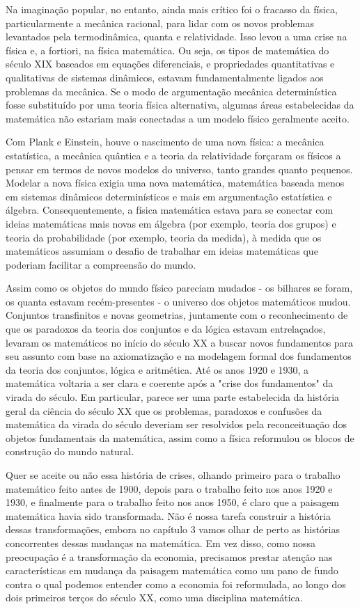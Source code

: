 \documentclass[12pt]{article}
\begin{document}
Na imaginação popular, no entanto, ainda mais crítico foi o fracasso da física, particularmente a mecânica racional, para lidar com os novos problemas levantados pela termodinâmica, quanta e relatividade. Isso levou a uma crise na física e, a fortiori, na física matemática. Ou seja, os tipos de matemática do século XIX baseados em equações diferenciais, e propriedades quantitativas e qualitativas de sistemas dinâmicos, estavam fundamentalmente ligados aos problemas da mecânica. Se o modo de argumentação mecânica determinística fosse substituído por uma teoria física alternativa, algumas áreas estabelecidas da matemática não estariam mais conectadas a um modelo físico geralmente aceito.

Com Plank e Einstein, houve o nascimento de uma nova física: a mecânica estatística, a mecânica quântica e a teoria da relatividade forçaram os físicos a pensar em termos de novos modelos do universo, tanto grandes quanto pequenos. Modelar a nova física exigia uma nova matemática, matemática baseada menos em sistemas dinâmicos determinísticos e mais em argumentação estatística e álgebra. Consequentemente, a física matemática estava para se conectar com ideias matemáticas mais novas em álgebra (por exemplo, teoria dos grupos) e teoria da probabilidade (por exemplo, teoria da medida), à medida que os matemáticos assumiam o desafio de trabalhar em ideias matemáticas que poderiam facilitar a compreensão do mundo.

Assim como os objetos do mundo físico pareciam mudados - os bilhares se foram, os quanta estavam recém-presentes - o universo dos objetos matemáticos mudou. Conjuntos transfinitos e novas geometrias, juntamente com o reconhecimento de que os paradoxos da teoria dos conjuntos e da lógica estavam entrelaçados, levaram os matemáticos no início do século XX a buscar novos fundamentos para seu assunto com base na axiomatização e na modelagem formal dos fundamentos da teoria dos conjuntos, lógica e aritmética. Até os anos 1920 e 1930, a matemática voltaria a ser clara e coerente após a "crise dos fundamentos" da virada do século. Em particular, parece ser uma parte estabelecida da história geral da ciência do século XX que os problemas, paradoxos e confusões da matemática da virada do século deveriam ser resolvidos pela reconceituação dos objetos fundamentais da matemática, assim como a física reformulou os blocos de construção do mundo natural.

Quer se aceite ou não essa história de crises, olhando primeiro para o trabalho matemático feito antes de 1900, depois para o trabalho feito nos anos 1920 e 1930, e finalmente para o trabalho feito nos anos 1950, é claro que a paisagem matemática havia sido transformada. Não é nossa tarefa construir a história dessas transformações, embora no capítulo 3 vamos olhar de perto as histórias concorrentes dessas mudanças na matemática. Em vez disso, como nossa preocupação é a transformação da economia, precisamos prestar atenção nas características em mudança da paisagem matemática como um pano de fundo contra o qual podemos entender como a economia foi reformulada, ao longo dos dois primeiros terços do século XX, como uma disciplina matemática.
\end{document}
